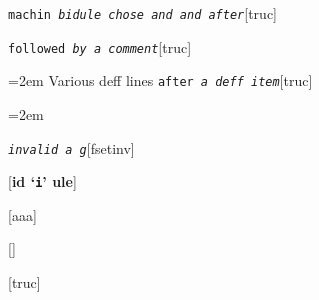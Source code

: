 \documentclass{book}
\newenvironment{GNUTexinfopreformatted}{%
  \par\begingroup\obeylines\obeyspaces\frenchspacing}{\endgroup}
\begin{document}
%
\noindent\texttt{machin \EmbracOn{}\textnormal{\textsl{bidule chose and and after}}\EmbracOff{}}\hfill[truc]



%
\noindent\texttt{followed \EmbracOn{}\textnormal{\textsl{by a comment}}\EmbracOff{}}\hfill[truc]



%
\begin{GNUTexinfopreformatted}
\leftskip=2em \parskip=0pt \parindent=0pt \ttfamily%
Various deff lines
\end{GNUTexinfopreformatted}
\noindent\texttt{after \EmbracOn{}\textnormal{\textsl{a deff item}}\EmbracOff{}}\hfill[truc]



%
\begin{GNUTexinfopreformatted}
\leftskip=2em \parskip=0pt \parindent=0pt \ttfamily%

\end{GNUTexinfopreformatted}
\noindent\texttt{\textsl{invalid} \EmbracOn{}\textnormal{\textsl{a g}}\EmbracOff{}}\hfill[fsetinv]



%
\noindent\texttt{}\hfill[\textbf{id `\texttt{i}' ule}]




\noindent\texttt{}\hfill[aaa]



\noindent\texttt{}\hfill[]



\noindent\texttt{}\hfill[truc]
\end{document}
